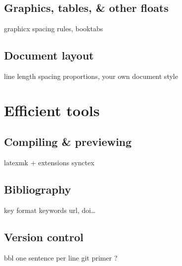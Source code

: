 \documentclass[a4paper,twoside,nofonts]{tufte-handout}
\begin{document}
\subsection{Graphics, tables, \& other floats} %
\label{sub:graphics}

\begin{todoenv}
    graphicx
    spacing
    rules, booktabs
\end{todoenv}

\subsection{Document layout} %
\label{sub:layout}

\begin{todoenv}
    line length
    spacing
    proportions, your own document style
\end{todoenv}



\clearpage
\section{Efficient tools} %
\label{sec:tools}

\subsection{Compiling \& previewing} %
\label{sub:compiling}

\begin{todoenv}
    latexmk + extensions
    synctex
\end{todoenv}

\subsection{Bibliography} %
\label{sub:bibliography}

\begin{todoenv}
    key format
    keywords
    url, doi…
\end{todoenv}

\subsection{Version control} %
\label{sub:vcs}

\begin{todoenv}
    bbl
    one sentence per line
    git primer ?
\end{todoenv}
\end{document}
